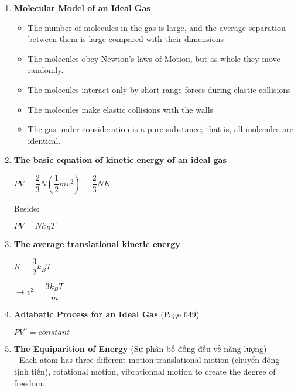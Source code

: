 \documentclass[10pt]{article}
\begin{document}
\begin{enumerate}
	\item \textbf{Molecular Model of an Ideal Gas}
	\begin{itemize}
		\item The number of molecules in the gas is large, and the average separation between them is large compared with their dimensions
		\item The molecules obey Newton's laws of Motion, but as whole they move randomly.
		\item The molecules interact only by short-range forces during elastic collisions
		\item The molecules make elastic collisions with the walls
		\item The gas under consideration is a pure substance; that is, all molecules are identical.
	\end{itemize}
	\item \textbf{The basic equation of kinetic energy of an ideal gas}
	\begin{mybox}
	\begin{center}
	$PV = \dfrac{2}{3}N(\dfrac{1}{2}m \overline{v^2}) = \dfrac{2}{3}N \overline{K}$
	\end{center}
	\end{mybox}
	Beside: 
	\begin{mybox}
	$PV = Nk_BT$
	\end{mybox}
	\item \textbf{The average translational kinetic energy}
	\begin{mybox}
	\begin{center}
	$\overline{K} = \dfrac{3}{2}k_BT$
	\end{center}
	\end{mybox}
	\begin{center}
	$\rightarrow{\overline{v^2} = \dfrac{3k_BT}{m}}$
	\end{center}
	\item \textbf{Adiabatic Process for an Ideal Gas} (Page 649)
	\begin{mybox}
	\begin{center}
	$PV^{\gamma} = constant$
	\end{center}
	\end{mybox}
	\item \textbf{The Equiparition of Energy} (Sự phân bố đồng đều về năng lượng)\\
	- Each atom has three different motion:translational motion (chuyển động tịnh tiến), rotational motion, vibrationnal motion to create the degree of freedom.\\

\end{enumerate}
\end{document}
